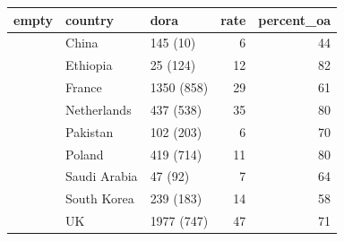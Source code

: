 \begin{table}[ht]
\centering
\begin{tabular}{lllrr}
 empty & country & dora & rate & percent\_oa \\ 
  \hline
 & China & 145 (10) & 6 & 44 \\ 
   & Ethiopia & 25 (124) & 12 & 82 \\ 
   & France & 1350 (858) & 29 & 61 \\ 
   & Netherlands & 437 (538) & 35 & 80 \\ 
   & Pakistan & 102 (203) & 6 & 70 \\ 
   & Poland & 419 (714) & 11 & 80 \\ 
   & Saudi Arabia & 47 (92) & 7 & 64 \\ 
   & South Korea & 239 (183) & 14 & 58 \\ 
   & UK & 1977 (747) & 47 & 71 \\ 
  \end{tabular}
\end{table}
